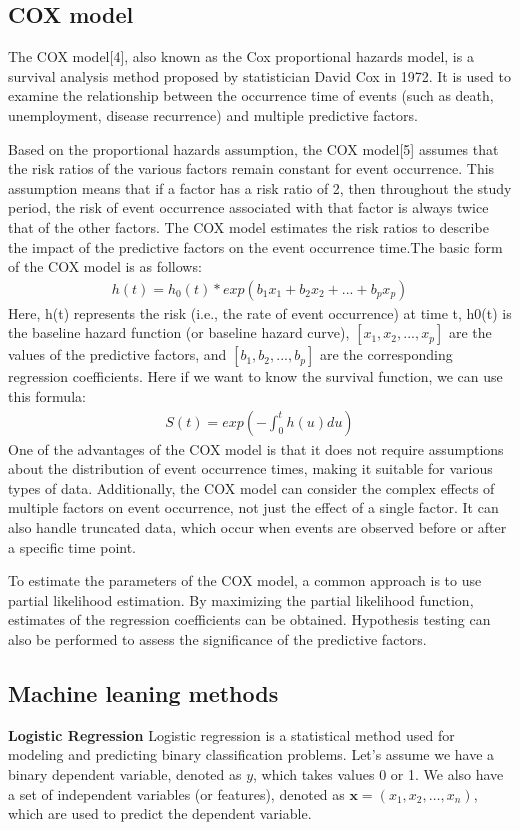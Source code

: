 \documentclass[conference]{IEEEconf}
\begin{document}
\subsection{COX model}
The COX model[4], also known as the Cox proportional hazards model, is a survival analysis method proposed by statistician David Cox in 1972. It is used to examine the relationship between the occurrence time of events (such as death, unemployment, disease recurrence) and multiple predictive factors.

Based on the proportional hazards assumption, the COX model[5] assumes that the risk ratios of the various factors remain constant for event occurrence. This assumption means that if a factor has a risk ratio of 2, then throughout the study period, the risk of event occurrence associated with that factor is always twice that of the other factors. The COX model estimates the risk ratios to describe the impact of the predictive factors on the event occurrence time.The basic form of the COX model is as follows:
\begin{eqnarray}
	h(t) = h_{0}(t) * exp(b_{1}x_{1} + b_{2}x_{2} + ... + b_{p}x_{p})
\end{eqnarray}
Here, h(t) represents the risk (i.e., the rate of event occurrence) at time t, h0(t) is the baseline hazard function (or baseline hazard curve), $[x_{1}, x_{2}, ..., x_{p}]$ are the values of the predictive factors, and  $[b_{1}, b_{2}, ..., b_{p}]$  are the corresponding regression coefficients.
Here if we want to know the survival function, we can use this formula:
\begin{eqnarray}
	S(t)=exp(-\int_{0}^{t}h(u)du )
\end{eqnarray}
One of the advantages of the COX model is that it does not require assumptions about the distribution of event occurrence times, making it suitable for various types of data. Additionally, the COX model can consider the complex effects of multiple factors on event occurrence, not just the effect of a single factor. It can also handle truncated data, which occur when events are observed before or after a specific time point.

To estimate the parameters of the COX model, a common approach is to use partial likelihood estimation. By maximizing the partial likelihood function, estimates of the regression coefficients can be obtained. Hypothesis testing can also be performed to assess the significance of the predictive factors.
\subsection{Machine leaning methods}
\textbf{Logistic Regression} Logistic regression is a statistical method used for modeling and predicting binary classification problems. Let's assume we have a binary dependent variable, denoted as $y$, which takes values 0 or 1. We also have a set of independent variables (or features), denoted as $\mathbf{x} = (x_1, x_2, \ldots, x_n)$, which are used to predict the dependent variable.
\end{document}
